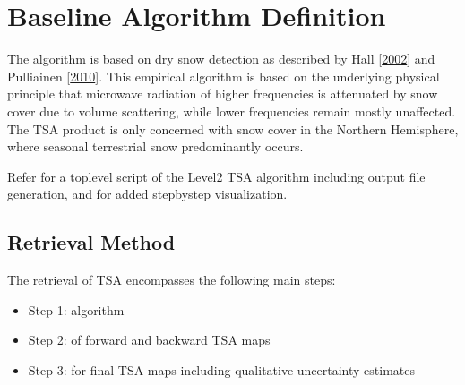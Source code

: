 \documentclass[letterpaper,10pt,english]{jupyterBook}
\begin{document}
\sphinxstepscope


\chapter{Baseline Algorithm Definition}
\label{\detokenize{book/baseline_algorithm_definition:baseline-algorithm-definition}}\label{\detokenize{book/baseline_algorithm_definition::doc}}
\sphinxAtStartPar
The {\hyperref[\detokenize{book/acronyms:term-TSA}]{}} algorithm is based on dry snow detection as described by Hall  {[}\hyperlink{cite.book/references:id2}{2002}{]} and Pulliainen  {[}\hyperlink{cite.book/references:id3}{2010}{]}. This empirical algorithm is based on the underlying physical principle that microwave radiation of higher frequencies is attenuated by snow cover due to volume scattering, while lower frequencies remain mostly unaffected.
The TSA product is only concerned with snow cover in the Northern Hemisphere, where seasonal terrestrial snow predominantly occurs.


\nopagebreak


\sphinxAtStartPar
Refer  for a top\sphinxhyphen{}level script of the Level\sphinxhyphen{}2 TSA algorithm including output file generation, and  for added step\sphinxhyphen{}by\sphinxhyphen{}step visualization.




\section{Retrieval Method}
\label{\detokenize{book/baseline_algorithm_definition:retrieval-method}}
\sphinxAtStartPar
The retrieval of TSA encompasses the following main steps:
\begin{itemize}
\item {} 
\sphinxAtStartPar
Step 1:  algorithm

\item {} 
\sphinxAtStartPar
Step 2:  of forward and backward TSA maps

\item {} 
\sphinxAtStartPar
Step 3:  for final TSA maps including qualitative uncertainty estimates

\end{itemize}
\end{document}
